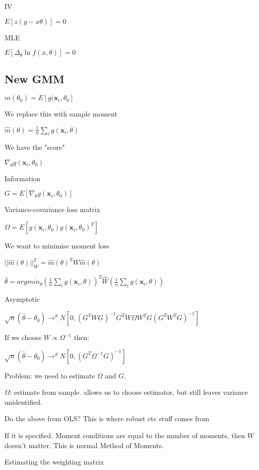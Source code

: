 IV

\(E[z(y-x\theta)]=0\)

MLE

\(E[\Delta_\theta \ln f(x, \theta)]=0\)








\subsection{New GMM}


\(m(\theta_0)=E[g(\mathbf x_i, \theta_0]\)

We replace this with sample moment

\(\hat m(\theta)=\frac{1}{n}\sum_ig(\mathbf x_i, \theta)\)

We have the "score"

\(\nabla_\theta g(\mathbf x_i, \theta_0)\)

Information

\(G=E[\nabla_\theta g(\mathbf x_i, \theta_0)]\)

Variance-covariance loss matrix

\(\Omega =E[g(\mathbf x_i, \theta_0)g(\mathbf x_i, \theta_0)^T]\)

We want to minimise moment loss

\(||\hat m(\theta)||^2_W=\hat m(\theta )^TW\hat m(\theta)\)

\(\hat \theta = argmin_\theta (\frac{1}{n}\sum_ig(\mathbf x_i, \theta))^T\hat W(\frac{1}{n}\sum_ig(\mathbf x_i, \theta))\)

Asymptotic

\(\sqrt n (\hat \theta -\theta_0)\rightarrow^d N[0, (G^TWG)^{-1}G^TW\Omega W^TG(G^TW^TG)^{-1}]\)

If we choose \(W\propto \Omega^{-1}\) then:

\(\sqrt n (\hat \theta -\theta_0)\rightarrow^d N[0, (G^T\Omega^{-1} G)^{-1}]\)

Problem: we need to estimate \(\Omega \) and \(G\).

\(\Omega \): estimate from sample. allows us to choose estimator, but still leaves variance unidentified.

Do the above from OLS? This is where robust etc stuff comes from

If it is specified. Moment conditions are equal to the number of moments, then \(W\) doesn't matter. This is normal Method of Moments.

Estimating the weighting matrix

